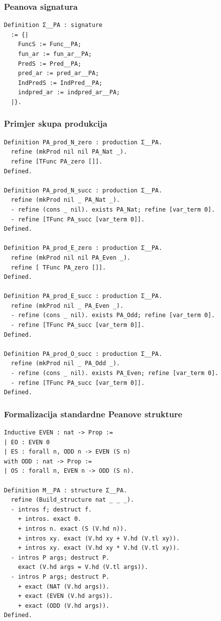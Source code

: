 \documentclass{beamer}
\begin{document}
\begin{frame}[fragile]
  \frametitle{Peanova signatura}
\begin{verbatim}
Definition Σ__PA : signature
  := {|
    FuncS := Func__PA;
    fun_ar := fun_ar__PA;
    PredS := Pred__PA;
    pred_ar := pred_ar__PA;
    IndPredS := IndPred__PA;
    indpred_ar := indpred_ar__PA;
  |}.
\end{verbatim}
\end{frame}
\addtocounter{framenumber}{-1}

\begin{frame}[fragile]
  \frametitle{Primjer skupa produkcija}
  \begin{tiny}
\begin{verbatim}
Definition PA_prod_N_zero : production Σ__PA.
  refine (mkProd nil nil PA_Nat _).
  refine [TFunc PA_zero []].
Defined.

Definition PA_prod_N_succ : production Σ__PA.
  refine (mkProd nil _ PA_Nat _).
  - refine (cons _ nil). exists PA_Nat; refine [var_term 0].
  - refine [TFunc PA_succ [var_term 0]].
Defined.

Definition PA_prod_E_zero : production Σ__PA.
  refine (mkProd nil nil PA_Even _).
  refine [ TFunc PA_zero []].
Defined.

Definition PA_prod_E_succ : production Σ__PA.
  refine (mkProd nil _ PA_Even _).
  - refine (cons _ nil). exists PA_Odd; refine [var_term 0].
  - refine [TFunc PA_succ [var_term 0]].
Defined.

Definition PA_prod_O_succ : production Σ__PA.
  refine (mkProd nil _ PA_Odd _).
  - refine (cons _ nil). exists PA_Even; refine [var_term 0].
  - refine [TFunc PA_succ [var_term 0]].
Defined.
\end{verbatim}
  \end{tiny}
\end{frame}
\addtocounter{framenumber}{-1}

\begin{frame}[fragile]
  \frametitle{Formalizacija standardne Peanove strukture}
  \begin{scriptsize}
\begin{verbatim}
Inductive EVEN : nat -> Prop :=
| EO : EVEN 0
| ES : forall n, ODD n -> EVEN (S n)
with ODD : nat -> Prop :=
| OS : forall n, EVEN n -> ODD (S n).

Definition M__PA : structure Σ__PA.
  refine (Build_structure nat _ _ _).
  - intros f; destruct f.
    + intros. exact 0.
    + intros n. exact (S (V.hd n)).
    + intros xy. exact (V.hd xy + V.hd (V.tl xy)).
    + intros xy. exact (V.hd xy * V.hd (V.tl xy)).
  - intros P args; destruct P.
    exact (V.hd args = V.hd (V.tl args)).
  - intros P args; destruct P. 
    + exact (NAT (V.hd args)).
    + exact (EVEN (V.hd args)).
    + exact (ODD (V.hd args)).
Defined.
\end{verbatim}
  \end{scriptsize}
\end{frame}
\addtocounter{framenumber}{-1}
\end{document}
